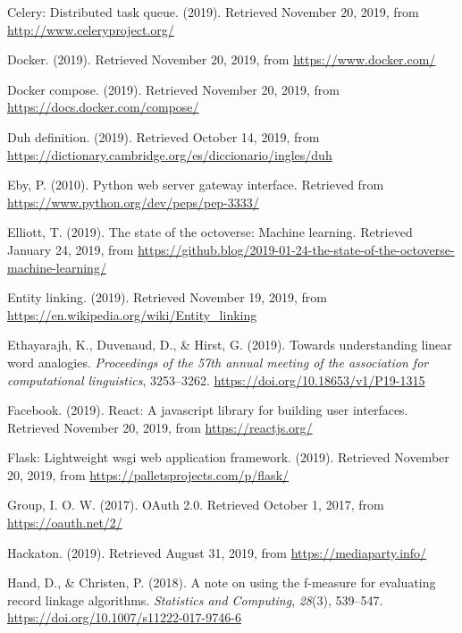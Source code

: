 \documentclass[12pt,a4paper,]{scrartcl}
\begin{document}
\leavevmode\hypertarget{ref-celery}{}%
Celery: Distributed task queue. (2019). Retrieved November 20, 2019, from \url{http://www.celeryproject.org/}

\leavevmode\hypertarget{ref-docker}{}%
Docker. (2019). Retrieved November 20, 2019, from \url{https://www.docker.com/}

\leavevmode\hypertarget{ref-dockercompose}{}%
Docker compose. (2019). Retrieved November 20, 2019, from \url{https://docs.docker.com/compose/}

\leavevmode\hypertarget{ref-cambridge_duh}{}%
Duh definition. (2019). Retrieved October 14, 2019, from \url{https://dictionary.cambridge.org/es/diccionario/ingles/duh}

\leavevmode\hypertarget{ref-pep-3333}{}%
Eby, P. (2010). Python web server gateway interface. Retrieved from \url{https://www.python.org/dev/peps/pep-3333/}

\leavevmode\hypertarget{ref-github_machine_learning}{}%
Elliott, T. (2019). The state of the octoverse: Machine learning. Retrieved January 24, 2019, from \url{https://github.blog/2019-01-24-the-state-of-the-octoverse-machine-learning/}

\leavevmode\hypertarget{ref-wiki_nel}{}%
Entity linking. (2019). Retrieved November 19, 2019, from \url{https://en.wikipedia.org/wiki/Entity_linking}

\leavevmode\hypertarget{ref-ethayarajh-etal-2019-towards}{}%
Ethayarajh, K., Duvenaud, D., \& Hirst, G. (2019). Towards understanding linear word analogies. \emph{Proceedings of the 57th annual meeting of the association for computational linguistics}, 3253--3262. \url{https://doi.org/10.18653/v1/P19-1315}

\leavevmode\hypertarget{ref-react}{}%
Facebook. (2019). React: A javascript library for building user interfaces. Retrieved November 20, 2019, from \url{https://reactjs.org/}

\leavevmode\hypertarget{ref-flask}{}%
Flask: Lightweight wsgi web application framework. (2019). Retrieved November 20, 2019, from \url{https://palletsprojects.com/p/flask/}

\leavevmode\hypertarget{ref-oauth2}{}%
Group, I. O. W. (2017). OAuth 2.0. Retrieved October 1, 2017, from \url{https://oauth.net/2/}

\leavevmode\hypertarget{ref-hackaton2019}{}%
Hackaton. (2019). Retrieved August 31, 2019, from \url{https://mediaparty.info/}

\leavevmode\hypertarget{ref-pub_1084928040}{}%
Hand, D., \& Christen, P. (2018). A note on using the f-measure for evaluating record linkage algorithms. \emph{Statistics and Computing}, \emph{28}(3), 539--547. \url{https://doi.org/10.1007/s11222-017-9746-6}
\end{document}
